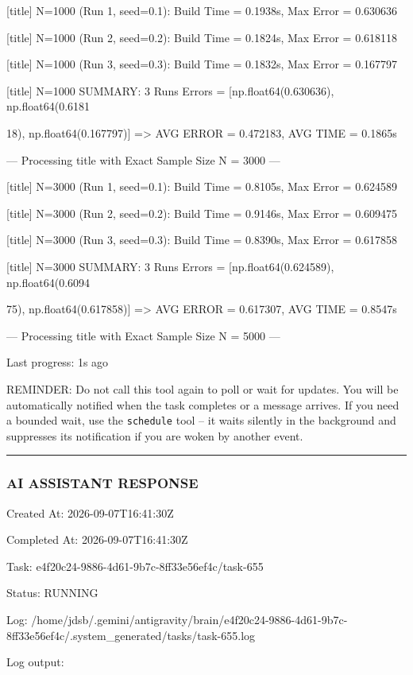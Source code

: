 \documentclass[11pt,a4paper]{article}
\begin{document}
[title] N=1000 (Run 1, seed=0.1): Build Time = 0.1938s, Max Error = 0.630636

[title] N=1000 (Run 2, seed=0.2): Build Time = 0.1824s, Max Error = 0.618118

[title] N=1000 (Run 3, seed=0.3): Build Time = 0.1832s, Max Error = 0.167797

[title] N=1000 SUMMARY: 3 Runs Errors = [np.float64(0.630636), np.float64(0.6181

18), np.float64(0.167797)] => AVG ERROR = 0.472183, AVG TIME = 0.1865s

--- Processing title with Exact Sample Size N = 3000 ---

[title] N=3000 (Run 1, seed=0.1): Build Time = 0.8105s, Max Error = 0.624589

[title] N=3000 (Run 2, seed=0.2): Build Time = 0.9146s, Max Error = 0.609475

[title] N=3000 (Run 3, seed=0.3): Build Time = 0.8390s, Max Error = 0.617858

[title] N=3000 SUMMARY: 3 Runs Errors = [np.float64(0.624589), np.float64(0.6094

75), np.float64(0.617858)] => AVG ERROR = 0.617307, AVG TIME = 0.8547s

--- Processing title with Exact Sample Size N = 5000 ---


Last progress: 1s ago



REMINDER: Do not call this tool again to poll or wait for updates. You will be automatically notified when the task completes or a message arrives. If you need a bounded wait, use the \texttt{schedule} tool -- it waits silently in the background and suppresses its notification if you are woken by another event.


\hrule

\subsubsection{AI ASSISTANT RESPONSE}

Created At: 2026-09-07T16:41:30Z

Completed At: 2026-09-07T16:41:30Z

Task: e4f20c24-9886-4d61-9b7c-8ff33e56ef4c/task-655

Status: RUNNING

Log: /home/jdsb/.gemini/antigravity/brain/e4f20c24-9886-4d61-9b7c-8ff33e56ef4c/.system\_generated/tasks/task-655.log

Log output:
\end{document}
